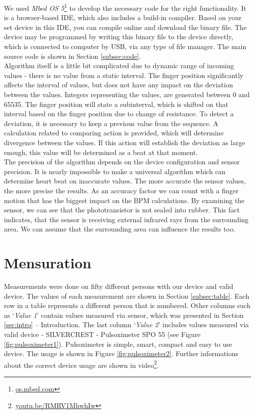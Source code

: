 \documentclass[11pt,a4paper]{article}
\begin{document}
We used \textit{Mbed OS 5}\footnote{\href{https://os.mbed.com/}{os.mbed.com}} to develop the necessary code for the right functionality. It is a browser-based IDE, which also includes a build-in compiler. Based on your set device in this IDE, you can compile online and download the binary file. The device may be programmed by writing this binary file to the device directly, which is connected to computer by USB, via any type of file manager. The main source code is shown in Section \ref{subsec:code}.\\

Algorithm itself is a little bit complicated due to dynamic range of incoming values - there is no value from a static interval. The finger position significantly affects the interval of values, but does not have any impact on the deviation between the values. Integers representing the values, are generated between 0 and 65535. The finger position will state a subinterval, which is shifted on that interval based on the finger position due to change of resistance. To detect a deviation, it is necessary to keep a previous value from the sequence. A calculation related to comparing action is provided, which will determine divergence between the values. If this action will establish the deviation as large enough, this value will be determined as a beat at that moment.\\

The precision of the algorithm depends on the device configuration and sensor precision. It is nearly impossible to make a universal algorithm which can determine heart beat on inaccurate values. The more accurate the sensor values, the more precise the results. As an accuracy factor we can count with a finger motion that has the biggest impact on the BPM calculations. By examining the sensor, we can see that the phototransistor is not sealed into rubber. This fact indicates, that the sensor is receiving external infrared rays from the surrounding area. We can assume that the surrounding area can influence the results too.

\section{Mensuration}\label{sec:mensuration}

Measurements were done on fifty different persons with our device and valid device. The values of each measurement are shown in Section \ref{subsec:table}. Each row in a table represents a different person that is numbered. Other columns such as `\textit{Value 1}' contain values measured via sensor, which was presented in Section \ref{sec:intro} -- Introduction. The last column `\textit{Value 2}' includes values measured via valid device - SILVERCREST - Pulsoximeter SPO 55 (see Figure \ref{fig:pulsoximeter1}). Pulsoximeter is simple, smart, compact and easy to use device. The usage is shown in Figure \ref{fig:pulsoximeter2}. Further informations about the correct device usage are shown in video\footnote{\href{https://youtu.be/RMRV1MhwhIw}{youtu.be/RMRV1MhwhIw}}.\\
\end{document}
